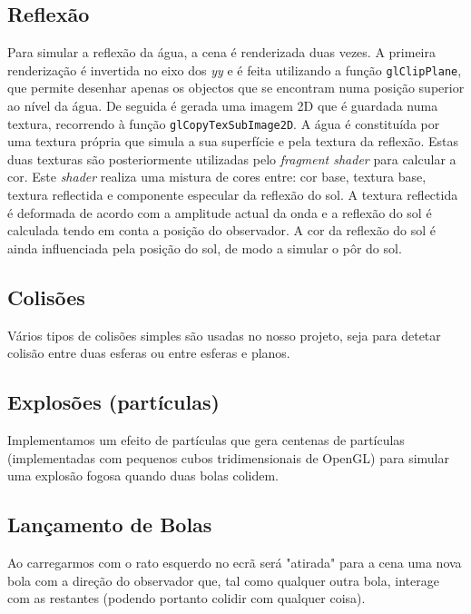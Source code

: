 \documentclass[12pt]{article}
\begin{document}
\subsection*{Reflexão}
Para simular a reflexão da água, a cena é renderizada duas vezes. A primeira renderização é invertida no eixo dos \textit{yy} e é feita utilizando a função \texttt{glClipPlane}, que permite desenhar apenas os objectos que se encontram numa posição superior ao nível da água. De seguida é gerada uma imagem 2D que é guardada numa textura, recorrendo à função \texttt{glCopyTexSubImage2D}. A água é constituída por uma textura própria que simula a sua superfície e pela textura da reflexão. Estas duas texturas são posteriormente utilizadas pelo \textit{fragment shader} para calcular a cor. Este \textit{shader} realiza uma mistura de cores entre: cor base, textura base, textura reflectida e componente especular da reflexão do sol. A textura reflectida é deformada de acordo com a amplitude actual da onda e a reflexão do sol é calculada tendo em conta a posição do observador. A cor da reflexão do sol é ainda influenciada pela posição do sol, de modo a simular o pôr do sol.

\subsection*{Colisões}
Vários tipos de colisões simples são usadas no nosso projeto, seja para detetar colisão entre duas esferas ou entre esferas e planos.

\subsection*{Explosões (partículas)}
Implementamos um efeito de partículas que gera centenas de partículas (implementadas com pequenos cubos tridimensionais de OpenGL) para simular uma explosão fogosa quando duas bolas colidem.

\subsection*{Lançamento de Bolas}
Ao carregarmos com o rato esquerdo no ecrã será "atirada" para a cena uma nova bola com a direção
do observador que, tal como qualquer outra bola, interage com as restantes (podendo portanto colidir com qualquer coisa).
\end{document}
